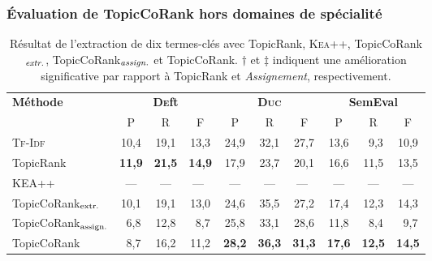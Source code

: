       \subsubsection{Évaluation de TopicCoRank hors domaines de spécialité}
      \label{subsubsec:main-domain_specific_keyphrase_annotation-supervised_automatic_keyphrase_annotation-evaluation-topiccorank_indepent_domains}
        \begin{table}[h!]
          \centering
            \begin{tabular}{l|ccc|ccc|ccc}
              \toprule
              \multirow{2}{*}{\textbf{Méthode}} & \multicolumn{3}{c|}{\textbf{\textsc{De}ft}} & \multicolumn{3}{c|}{\textbf{\textsc{Duc}}} & \multicolumn{3}{c}{\textbf{SemEval}}\\
              \cline{2-10}
              & P & R & F & P & R & F & P & R & F\\
              \hline
              \textsc{Tf-Idf} & 10,4 & 19,1 & 13,3 & 24,9 & 32,1 & 27,7 & 13,6 & $~~$9,3 & 10,9\\
              TopicRank & \textbf{11,9} & \textbf{21,5} & \textbf{14,9} & 17,9 & 23,7 & 20,1 & 16,6 & 11,5 & 13,5\\
              KEA++ & --- & --- & ---$^{~~}$ & --- & --- & ---$^{~~}$ & --- & --- & ---\\
              \hline
              TopicCoRank$_\textnormal{extr.}$ & 10,1 & 19,1 & 13,0 & 24,6 & 35,5 & 27,2 & 17,4 & 12,3 & 14,3\\
              TopicCoRank$_\textnormal{assign.}$ & $~~$6,8 & 12,8 & $~~$8,7 & 25,8 & 33,1 & 28,6 & 11,8 & $~~$8,4 & $~~$9,7\\
              \hline
              TopicCoRank & $~~$8,7 & 16,2 & 11,2 & \textbf{28,2} & \textbf{36,3} & \textbf{31,3} & \textbf{17,6} & \textbf{12,5} & \textbf{14,5}\\
              \bottomrule
            \end{tabular}
        \caption[
          Résultat de l'extraction de dix termes-clés avec TopicRank,
          \textsc{Kea++}, TopicCoRank$_\textnormal{\textit{extr.}}$,
          TopicCoRank$_\textnormal{\textit{assign.}}$ et TopicCoRank
        ]{
          Résultat de l'extraction de dix termes-clés avec TopicRank,
          \textsc{Kea++}, TopicCoRank$_\textnormal{\textit{extr.}}$,
          TopicCoRank$_\textnormal{\textit{assign.}}$ et TopicCoRank. $\dagger$
          et $\ddagger$ indiquent une amélioration significative par rapport à
          TopicRank et \textit{Assignement}, respectivement.
          \label{tab:topiccorank-comparison_results}}
        \end{table}

